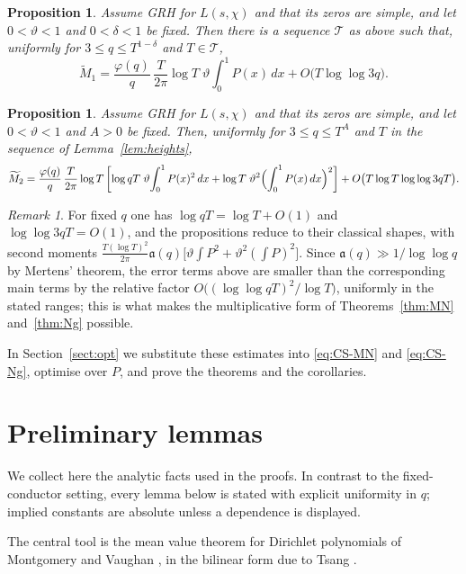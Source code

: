 \documentclass[12pt,a4paper,reqno]{amsart}
\newtheorem{proposition}[theorem]{Proposition}
\theoremstyle{remark}
\newtheorem*{remark}{Remark}
\numberwithin{equation}{section}
\begin{document}
\begin{proposition}\label{prop:M1Ng}
Assume GRH for $L(s,\chi)$ and that its zeros are simple, and let $0<\vartheta<1$ and $0<\delta<1$ be fixed. Then there is a sequence $\mathcal T$ as above such that, uniformly for $3\le q\le T^{1-\delta}$ and $T\in\mathcal T$,
\[
\widetilde M_1=\frac{\varphi(q)}{q}\,\frac{T}{2\pi}\log T\;\vartheta\!\int_0^1 P(x)\,dx+O\bigl(T\log\log 3q\bigr).
\]
\end{proposition}

\begin{proposition}\label{prop:M2Ng}
Assume GRH for $L(s,\chi)$ and that its zeros are simple, and let $0<\vartheta<1$ and $A>0$ be fixed. Then, uniformly for $3\le q\le T^{A}$ and $T$ in the sequence of Lemma~\ref{lem:heights},
\[
\widetilde M_2=\frac{\varphi(q)}{q}\,\frac{T}{2\pi}\log T\left[\log qT\;\vartheta\!\int_0^1 P(x)^2\,dx+\log T\;\vartheta^2\Bigl(\int_0^1 P(x)\,dx\Bigr)^2\right]+O\bigl(T\log T\log\log 3qT\bigr).
\]
\end{proposition}

\begin{remark}
For fixed $q$ one has $\log qT=\log T+O(1)$ and $\log\log 3qT=O(1)$, and the propositions reduce to their classical shapes, with second moments $\tfrac{T(\log T)^2}{2\pi}\mathfrak a(q)\bigl[\vartheta\int P^2+\vartheta^2(\int P)^2\bigr]$. Since $\mathfrak a(q)\gg1/\log\log q$ by Mertens' theorem, the error terms above are smaller than the corresponding main terms by the relative factor $O\bigl((\log\log qT)^2/\log T\bigr)$, uniformly in the stated ranges; this is what makes the multiplicative form of Theorems~\ref{thm:MN} and~\ref{thm:Ng} possible.
\end{remark}

In Section~\ref{sect:opt} we substitute these estimates into \eqref{eq:CS-MN} and \eqref{eq:CS-Ng}, optimise over $P$, and prove the theorems and the corollaries.

\section{Preliminary lemmas}\label{sect:lemmas}

We collect here the analytic facts used in the proofs. In contrast to the fixed-conductor setting, every lemma below is stated with explicit uniformity in $q$; implied constants are absolute unless a dependence is displayed.

The central tool is the mean value theorem for Dirichlet polynomials of Montgomery and Vaughan \cite{MV}, in the bilinear form due to Tsang \cite{Tsang}.
\end{document}
